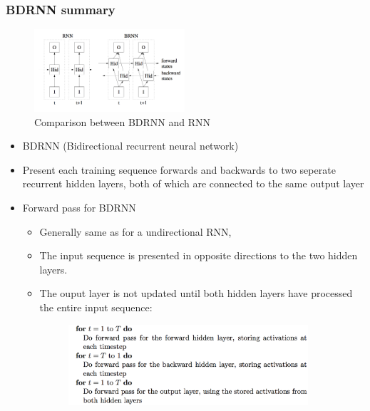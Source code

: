 \documentclass{beamer}
\begin{document}
\frame
{
    \frametitle{BDRNN summary}
	\begin{figure}[ht]  
		\begin{center}
			\includegraphics[width=2.2in]{Images/BDRNN_RNN.png}   
		\end{center}   
		\caption{Comparison between BDRNN and RNN}
	\end{figure}
    \begin{itemize}
        \item BDRNN (Bidirectional recurrent neural network) 
        \item Present each training sequence forwards and backwards to two seperate recurrent hidden layers, 
            both of which are connected to the same output layer
    \end{itemize}
}
\frame
{
    \begin{itemize}
        \item Forward pass for BDRNN 
            \begin{itemize} 
                \item Generally same as for a undirectional RNN, 
                \item The input sequence is presented in opposite directions to the two hidden layers. 
                \item The ouput layer is not updated until both hidden layers have processed the entire input sequence:
	            \begin{figure}[ht]  
	            	\begin{center}
	            		\includegraphics[width=3.5in]{Images/BDRNN_forward_pass.png}   
	            	\end{center}   
	            \end{figure}
            \end{itemize}
    \end{itemize}
}
\frame
\end{document}
